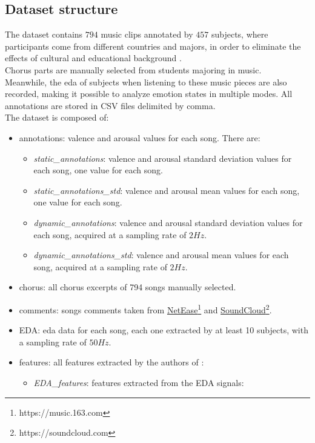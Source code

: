 \subsection{Dataset structure}
The dataset contains $794$ music clips annotated by $457$ subjects, where participants come from different countries and majors, in order to eliminate the effects of cultural and educational background \cite{hu2017cross}.
\\
Chorus parts are manually selected from students majoring in music.
\\ \indent
Meanwhile, the \gls{eda} of subjects when listening to these music pieces are also recorded, making it possible to analyze emotion states in multiple modes. All annotations are stored in CSV files delimited by comma.
\\
The dataset is composed of:
\begin{itemize}
	\item annotations: valence and arousal values for each song. There are:
	\begin{itemize}
		\item \textit{static\_annotations}: valence and arousal standard deviation values for each song, one value for each song.
		\item \textit{static\_annotations\_std}: valence and arousal mean values for each song, one value for each song.
		\item \textit{dynamic\_annotations}: valence and arousal standard deviation values for each song, acquired at a sampling rate of $2Hz$.
		\item \textit{dynamic\_annotations\_std}: valence and arousal mean values for each song, acquired at a sampling rate of $2Hz$.
	\end{itemize}
	\item chorus: all chorus excerpts of 794 songs manually selected.
	\item comments: songs comments taken from \href{https://music.163.com}{NetEase}\footnote{https://music.163.com} and \href{https://soundcloud.com}{SoundCloud}\footnote{https://soundcloud.com}.
	\item EDA: \gls{eda} data for each song, each one extracted by at least 10 subjects, with a sampling rate of $50Hz$.
	\item features: all features extracted by the authors of \cite{zhang2018pmemo}:
	\begin{itemize}
		\item \textit{EDA\_features}: features extracted from the EDA signals:
		\begin{itemize}

\end{itemize}
\end{itemize}
\end{itemize}
